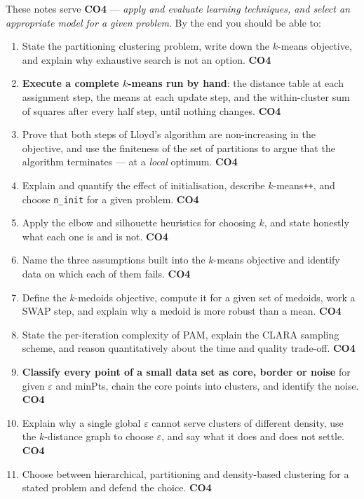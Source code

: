 \documentclass[11pt]{article}
\begin{document}
These notes serve \textbf{CO4} --- \emph{apply and evaluate learning
techniques, and select an appropriate model for a given problem}. By the end
you should be able to:

\begin{enumerate}[leftmargin=*]
  \item State the partitioning clustering problem, write down the $k$-means
    objective, and explain why exhaustive search is not an option.
    \hfill \textbf{CO4}
  \item \textbf{Execute a complete $k$-means run by hand}: the distance table
    at each assignment step, the means at each update step, and the
    within-cluster sum of squares after every half step, until nothing
    changes. \hfill \textbf{CO4}
  \item Prove that both steps of Lloyd's algorithm are non-increasing in the
    objective, and use the finiteness of the set of partitions to argue that
    the algorithm terminates --- at a \emph{local} optimum. \hfill \textbf{CO4}
  \item Explain and quantify the effect of initialisation, describe
    $k$-means\texttt{++}, and choose \texttt{n\_init} for a given
    problem. \hfill \textbf{CO4}
  \item Apply the elbow and silhouette heuristics for choosing $k$, and state
    honestly what each one is and is not. \hfill \textbf{CO4}
  \item Name the three assumptions built into the $k$-means objective and
    identify data on which each of them fails. \hfill \textbf{CO4}
  \item Define the $k$-medoids objective, compute it for a given set of
    medoids, work a SWAP step, and explain why a medoid is more robust than a
    mean. \hfill \textbf{CO4}
  \item State the per-iteration complexity of PAM, explain the CLARA
    sampling scheme, and reason quantitatively about the time and quality
    trade-off. \hfill \textbf{CO4}
  \item \textbf{Classify every point of a small data set as core, border or
    noise} for given $\varepsilon$ and minPts, chain the core points into
    clusters, and identify the noise. \hfill \textbf{CO4}
  \item Explain why a single global $\varepsilon$ cannot serve clusters of
    different density, use the $k$-distance graph to choose $\varepsilon$, and
    say what it does and does not settle. \hfill \textbf{CO4}
  \item Choose between hierarchical, partitioning and density-based
    clustering for a stated problem and defend the choice. \hfill \textbf{CO4}
\end{enumerate}
\end{document}
